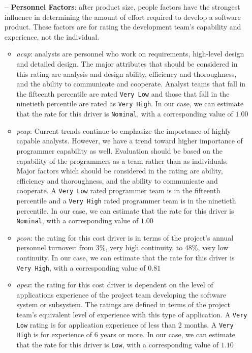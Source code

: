 \begin{itemize}
\begin{itemize}
	\end{itemize}
	
\item[\textbf{--}] \textbf{Personnel Factors}: after product size, people factors have the strongest influence in determining the amount of effort required to develop a software product. These factors are for rating the development team's capability and experience, not the individual. 

\begin{itemize}
	
	\item \textit{\acl{acap}}: analysts are personnel who work on requirements, high-level design and detailed design. The major attributes that should be considered in this rating are analysis and design ability, efficiency and thoroughness, and the ability to communicate and cooperate. Analyst teams that fall in the fifteenth percentile are rated \texttt{Very Low} and those that fall in the ninetieth percentile are rated as \texttt{Very High}.  In our case, we can estimate that the rate for this driver is \texttt{Nominal}, with a corresponding value of $1.00$
		
	\item \textit{\acl{pcap}}: Current trends continue to emphasize the importance of highly capable analysts. However, we have a trend toward higher importance of programmer capability as well.
Evaluation should be based on the capability of the programmers as a team rather than as individuals. Major factors which should be considered in the rating are ability, efficiency and thoroughness, and the ability to communicate and cooperate. A \texttt{Very Low} rated programmer team is in the fifteenth percentile and a \texttt{Very High} rated programmer team is in the ninetieth percentile. In our case, we can estimate that the rate for this driver is \texttt{Nominal}, with a corresponding value of $1.00$

	\item \textit{\acl{pcon}}: the rating for this cost driver is in terms of the project's annual personnel turnover: from 3\%, very high continuity, to 48\%, very low continuity. In our case, we can estimate that the rate for this driver is \texttt{Very High}, with a corresponding value of $0.81$
	
	\item \textit{\acl{apex}}: the rating for this cost driver is dependent on the level of applications experience of the project team developing the software system or subsystem. The ratings are defined in terms of the project team's equivalent level of experience with this type of application. A \texttt{Very Low} rating is for application experience of less than 2 months. A \texttt{Very High} is for experience of 6 years or more. In our case, we can estimate that the rate for this driver is \texttt{Low}, with a corresponding value of $1.10$
	

\end{itemize}
\end{itemize}
